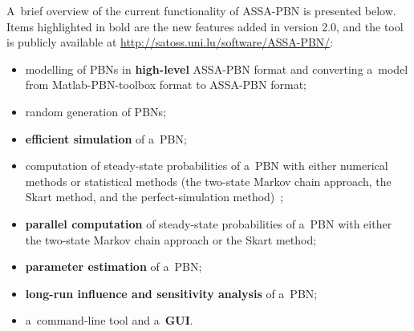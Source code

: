 \documentclass[runningheads,a4paper]{llncs}
\begin{document}
A~brief overview of the current functionality of {\sf ASSA-PBN} is presented below.
Items highlighted in bold are the new features added in version 2.0, and
the tool is publicly available at \url{http://satoss.uni.lu/software/ASSA-PBN/}:
\begin{itemize}
\item modelling of PBNs in \textbf{high-level} {\sf ASSA-PBN} format and converting a~model from Matlab-PBN-toolbox format to {\sf ASSA-PBN} format;
\item random generation of PBNs;
\item \textbf{efficient simulation} of a~PBN;
\item computation of steady-state probabilities of a~PBN with either numerical methods
or statistical methods (the two-state Markov chain approach, the Skart method, and the perfect-simulation method)~\cite{MPY15,RP09};
\item \textbf{parallel computation} of steady-state probabilities of a~PBN with either the two-state Markov chain approach
or the Skart method;
\item \textbf{parameter estimation} of a~PBN;
\item \textbf{long-run influence and sensitivity analysis} of a~PBN;
\item a~command-line tool and a~\textbf{GUI}.
\end{itemize}

\end{document}
